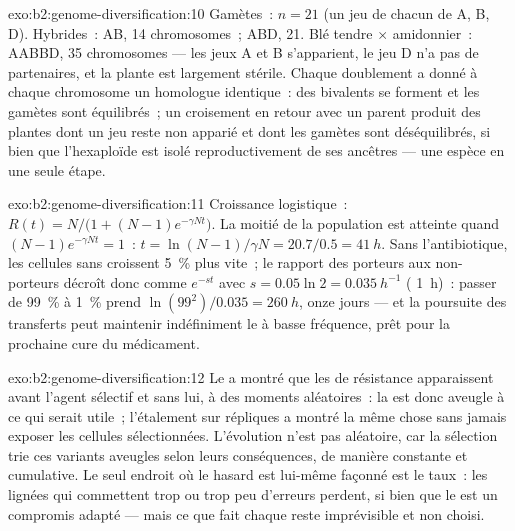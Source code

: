 \begin{solution}{exo:b2:genome-diversification:10}
Gamètes~: $n = 21$ (un jeu de chacun de A, B, D). Hybrides~: AB, 14
chromosomes~; ABD, 21. Blé tendre $\times$ amidonnier~: AABBD, 35
chromosomes --- les jeux A et B s'apparient, le jeu D n'a pas de
partenaires, et la plante est largement stérile. Chaque doublement a
donné à chaque chromosome un homologue identique~: des bivalents se
forment et les gamètes sont équilibrés~; un croisement en retour avec un
parent produit des plantes dont un jeu reste non apparié et dont les
gamètes sont déséquilibrés, si bien que l'hexaploïde est isolé
reproductivement de ses ancêtres --- une espèce en une seule étape.
\end{solution}

\begin{solution}{exo:b2:genome-diversification:11}
Croissance logistique~: $R(t) = N/\bigl(1 + (N - 1)e^{-\gamma Nt}\bigr)$.
La moitié de la population est atteinte quand $(N - 1)e^{-\gamma Nt} = 1$~:
$t = \ln(N -
1)/\gamma N = 20.7/0.5 = \qty{41}{h}$. Sans l'antibiotique, les cellules
sans  croissent \qty{5}{\%} plus vite~; le rapport des porteurs
aux non-porteurs décroît donc comme $e^{-st}$ avec $s = 0.05\ln 2 =
\qty{0.035}{h^{-1}}$ ( \qty{1}{h})~: passer de
\qty{99}{\%} à \qty{1}{\%} prend $\ln(99^2)/0.035 = \qty{260}{h}$, onze
jours --- et la poursuite des transferts peut maintenir indéfiniment le
 à basse fréquence, prêt pour la prochaine cure du médicament.
\end{solution}

\begin{solution}{exo:b2:genome-diversification:12}
Le  a montré que les  de résistance
apparaissent avant l'agent sélectif et sans lui, à des moments
aléatoires~: la  est donc aveugle à ce qui serait utile~;
l'étalement sur répliques a montré la même chose sans jamais exposer
les cellules sélectionnées. L'évolution n'est pas aléatoire, car la
sélection trie ces variants aveugles selon leurs conséquences, de
manière constante et cumulative. Le seul endroit où le hasard est
lui-même façonné est le taux~: les lignées qui commettent trop ou trop
peu d'erreurs perdent, si bien que le  est un compromis
adapté --- mais ce que fait chaque  reste imprévisible et non
choisi.
\end{solution}

